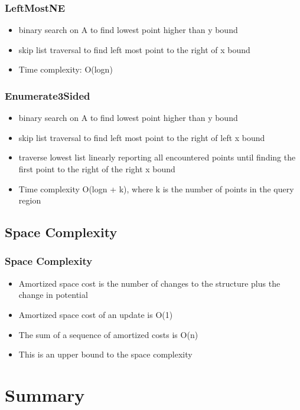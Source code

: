 \documentclass{beamer}
\begin{document}
\begin{frame}
  \frametitle{LeftMostNE}

  \begin{itemize}
  \item
    binary search on A to find lowest point higher than y bound
  \item
    skip list traversal to find left most point to the right of x bound
  \item
    Time complexity: O(logn)
  \end{itemize}

\end{frame}

\begin{frame}
  \frametitle{Enumerate3Sided}

  \begin{itemize}
  \item
    binary search on A to find lowest point higher than y bound
  \item
    skip list traversal to find left most point to the right of left x bound
  \item
    traverse lowest list linearly reporting all encountered points
    until finding the first point to the right of the right x bound
  \item
    Time complexity O(logn + k), where k is the number of points in the 
    query region
  \end{itemize}
\end{frame}

\subsection{Space Complexity}

\begin{frame}
  \frametitle{Space Complexity}

  \begin{itemize}
  \item
    Amortized space cost is the number of changes to the structure plus the
    change in potential
  \item
    Amortized space cost of an update is O(1)
  \item
    The sum of a sequence of amortized costs is O(n)
  \item
    This is an upper bound to the space complexity
  \end{itemize}  
\end{frame}

\section*{Summary}
\end{document}
